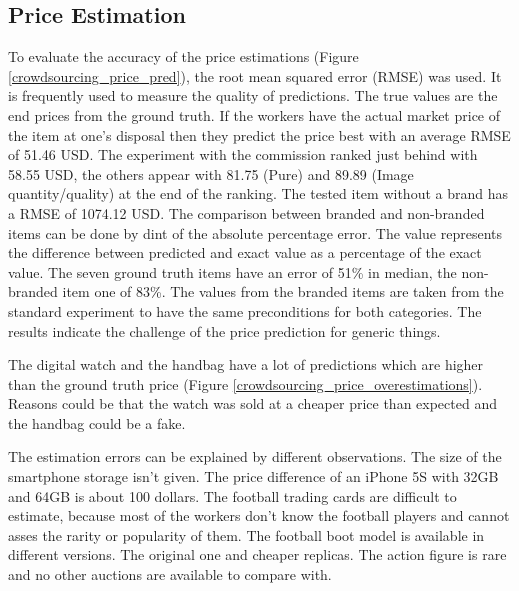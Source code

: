 \subsection{Price Estimation}
To evaluate the accuracy of the price estimations (Figure \ref{crowdsourcing_price_pred}), the root mean squared error (RMSE) was used. It is frequently used to measure the quality of predictions. The true values are the end prices from the ground truth. If the workers have the actual market price of the item at one's disposal then they predict the price best with an average RMSE of 51.46 USD. The experiment with the commission ranked just behind with 58.55 USD, the others appear with 81.75 (Pure) and 89.89 (Image quantity/quality) at the end of the ranking. The tested item without a brand has a RMSE of 1074.12 USD. The comparison between branded and non-branded items can be done by dint of the absolute percentage error. The value represents the difference between predicted and exact value as a percentage of the exact value. The seven ground truth items have an error of 51\% in median, the non-branded item one of 83\%. The values from the branded items are taken from the standard experiment to have the same preconditions for both categories. The results indicate the challenge of the price prediction for generic things.

The digital watch and the handbag have a lot of predictions which are higher than the ground truth price (Figure \ref{crowdsourcing_price_overestimations}). Reasons could be that the watch was sold at a cheaper price than expected and the handbag could be a fake.

The estimation errors can be explained by different observations. The size of the smartphone storage isn't given. The price difference of an iPhone 5S with 32GB and 64GB is about 100 dollars. The football trading cards are difficult to estimate, because most of the workers don't know the football players and cannot asses the rarity or popularity of them. The football boot model is available in different versions. The original one and cheaper replicas. The action figure is rare and no other auctions are available to compare with.

